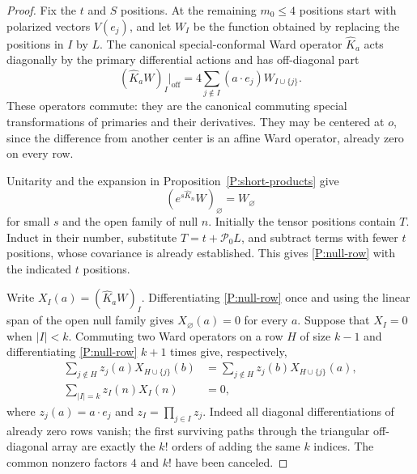 \begin{proof}
Fix the $t$ and $S$ positions.  At the remaining $m_0\leq4$ positions
start with polarized vectors $V(e_j)$, and let $W_I$ be the function
obtained by replacing the positions in $I$ by $L$.  The canonical
special-conformal Ward operator $\widehat K_a$ acts diagonally by the
primary differential actions and has off-diagonal part
\begin{equation}
 (\widehat K_a W)_I\big|_{\mathrm{off}}
       =4\sum_{j\notin I}(a\cdot e_j)W_{I\cup\{j\}}.
 \label{P:ward-off-diagonal}
\end{equation}
These operators commute: they are the canonical commuting special
transformations of primaries and their derivatives.  They may be
centered at $o$, since the difference from another center is an affine
Ward operator, already zero on every row.

Unitarity and the expansion in Proposition~\ref{P:short-products} give
\begin{equation}
 (e^{s\widehat K_n}W)_\varnothing=W_\varnothing
 \label{P:null-row}
\end{equation}
for small $s$ and the open family of null $n$.  Initially the tensor
positions contain $T$.  Induct in their number, substitute
$T=t+\mathcal P_0L$, and subtract terms with fewer $t$ positions, whose
covariance is already established.  This gives
\eqref{P:null-row} with the indicated $t$ positions.

Write $X_I(a)=(\widehat K_aW)_I$.  Differentiating
\eqref{P:null-row} once and using the linear span of the open null family
gives $X_\varnothing(a)=0$ for every $a$.  Suppose that $X_I=0$ when
$|I|<k$.  Commuting two Ward operators on a row $H$ of size $k-1$ and
differentiating \eqref{P:null-row} $k+1$ times give, respectively,
\begin{align}
 \sum_{j\notin H}z_j(a)X_{H\cup\{j\}}(b)
   &=\sum_{j\notin H}z_j(b)X_{H\cup\{j\}}(a),
       \label{P:row-symmetry}\\
 \sum_{|I|=k}z_I(n)X_I(n)&=0,
       \label{P:row-null}
\end{align}
where $z_j(a)=a\cdot e_j$ and $z_I=\prod_{j\in I}z_j$.
Indeed all diagonal differentiations of already zero rows vanish; the
first surviving paths through the triangular off-diagonal array are
exactly the $k!$ orders of adding the same $k$ indices.  The common
nonzero factors $4$ and $k!$ have been canceled.


\end{proof}
